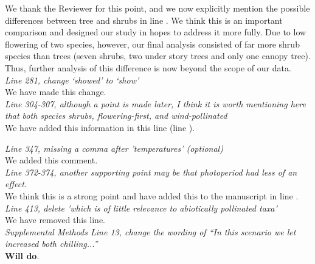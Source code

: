 \documentclass[11pt]{article}
\begin{document}
We thank the Reviewer for this point, and we now explicitly mention the possible differences between tree and shrubs in line . We think this is an important comparison and designed our study in hopes to address it more fully. Due to low flowering of two species, however, our final analysis consisted of far more shrub species than trees (seven shrubs, two under story trees and only one canopy tree). Thus, further analysis of this difference is now beyond the scope of our data.\\ %

\emph{Line 281, change `showed' to `show'}\\

We have made this change.\\

\emph{Line 304-307, although a point is made later, I think it is worth mentioning here that both species shrubs, flowering-first, and wind-pollinated}\\

We have added this information in this line (line ).

\emph{Line 347, missing a comma after 'temperatures' (optional)}\\

We added this comment.\\

\emph{Line 372-374, another supporting point may be that photoperiod had less of an effect}.\\

We think this is a strong point and have added this to the manuscript in line  .\\


\emph{Line 413, delete 'which is of little relevance to abiotically pollinated taxa'}\\

We have removed this line.\\

\emph{Supplemental Methods Line 13, change the wording of ``In this scenario we let increased both chilling...''}\\

\textbf{Will do}.\\

 
\end{document}
